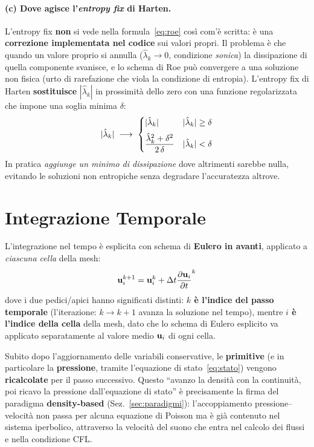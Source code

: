 \paragraph{(c) Dove agisce l'\emph{entropy fix} di Harten.}
L'entropy fix \textbf{non} si vede nella formula~\eqref{eq:roe} così com'è scritta: è una
\textbf{correzione implementata nel codice} sui valori propri. Il problema è che quando
un valore proprio si annulla ($\hat\lambda_k \to 0$, condizione \emph{sonica}) la
dissipazione di quella componente svanisce, e lo schema di Roe può convergere a una
soluzione non fisica (urto di rarefazione che viola la condizione di entropia).
L'entropy fix di Harten \textbf{sostituisce} $|\hat\lambda_k|$ in prossimità dello zero
con una funzione regolarizzata che impone una soglia minima $\delta$:
\begin{equation}
  |\hat\lambda_k| \;\longrightarrow\;
  \begin{dcases}
    |\hat\lambda_k| & |\hat\lambda_k| \ge \delta \\[2pt]
    \dfrac{\hat\lambda_k^2 + \delta^2}{2\,\delta} & |\hat\lambda_k| < \delta
  \end{dcases}
\end{equation}
In pratica \emph{aggiunge un minimo di dissipazione} dove altrimenti sarebbe nulla,
evitando le soluzioni non entropiche senza degradare l'accuratezza altrove.

\section{Integrazione Temporale}
\label{sec:integrazione_temporale}

L'integrazione nel tempo è esplicita con schema di \textbf{Eulero in avanti}, applicato
a \emph{ciascuna cella} della mesh:
\begin{equation}
  \mathbf{u}_i^{k+1} = \mathbf{u}_i^k + \Delta t \dfrac{\partial \mathbf{u}_i}{\partial t}^k
\end{equation}
dove i due pedici/apici hanno significati distinti: \textbf{$k$ è l'indice del passo
temporale} (l'iterazione: $k\to k+1$ avanza la soluzione nel tempo), mentre
\textbf{$i$ è l'indice della cella} della mesh, dato che lo schema di Eulero esplicito
va applicato separatamente al valore medio $\mathbf{u}_i$ di ogni cella.

Subito dopo l'aggiornamento delle variabili conservative, le \textbf{primitive} (e in
particolare la \textbf{pressione}, tramite l'equazione di stato~\eqref{eq:stato}) vengono
\textbf{ricalcolate} per il passo successivo. Questo ``avanzo la densità con la continuità,
poi ricavo la pressione dall'equazione di stato'' è precisamente la firma del paradigma
\textbf{density-based} (Sez.~\ref{sec:paradigmi}): l'accoppiamento pressione--velocità non
passa per alcuna equazione di Poisson ma è già contenuto nel sistema iperbolico, attraverso
la velocità del suono che entra nel calcolo dei flussi e nella condizione CFL.

